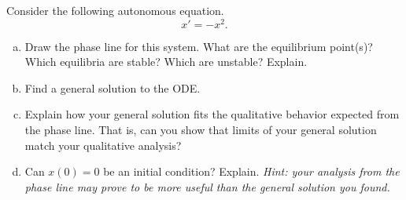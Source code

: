 \documentclass[12pt]{article} %
\begin{document}
\begin{problem} 
Consider the following autonomous equation.
    \[
    x'=-x^2.
    \]
    \begin{enumerate}[(a)]
        \item Draw the phase line for this system. What are the equilibrium point(s)? Which equilibria are stable? Which are unstable? Explain.
        \item Find a general solution to the ODE.
        \item Explain how your general solution fits the qualitative behavior expected from the phase line. That is, can you show that limits of your general solution match your qualitative analysis?
        \item Can $x(0)=0$ be an initial condition? Explain. \emph{Hint: your analysis from the phase line may prove to be more useful than the general solution you found.}
    \end{enumerate}
\end{problem}
\end{document}
